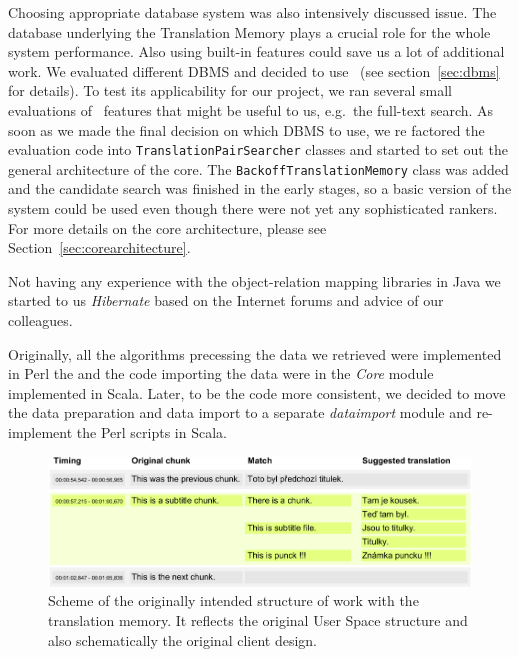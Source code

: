 Choosing appropriate database system was also intensively discussed issue. The database underlying the Translation Memory plays a crucial role for the whole system performance. Also using built-in features could save us a lot of additional work.  We evaluated different DBMS and decided to use \postgres~(see section~\ref{sec:dbms} for details). To test its applicability for our project, we ran several small evaluations of \postgres~features that might be useful to us, e.g.\ the full-text search. As soon as we made the final decision on which DBMS to use, we re factored the evaluation code into {\tt TranslationPairSearcher} classes and started to set out the general architecture of the core. The {\tt BackoffTranslationMemory} class was added and the candidate search was finished in the early stages, so a basic version of the system could be used even though there were not yet any sophisticated rankers. For more details on the core architecture, please see Section~\ref{sec:corearchitecture}.

Not having any experience with the object-relation mapping libraries in Java we started to us {\it Hibernate} based on the Internet forums and advice of our colleagues.

Originally, all the algorithms precessing the data we retrieved were implemented in Perl the and the code importing the data were in the \emph{Core} module implemented in Scala. Later, to be the code more consistent, we decided to move the data preparation and data import to a separate \emph{dataimport} module and re-implement the Perl scripts in Scala.

\begin{figure}[h]
\begin{center}
\includegraphics{./figures/original_strucutre.pdf}
\end{center}

\caption{Scheme of the originally intended structure of work with the translation memory. It reflects the original User Space structure and also schematically the original client design.}\label{fig:original_scheme}

\end{figure}

